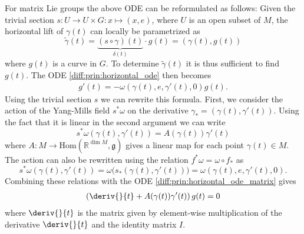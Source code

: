     \begin{example}
         For matrix Lie groups the above ODE can be reformulated as follows: Given the trivial section $s:U\rightarrow U\times G:x\mapsto (x, e)$, where $U$ is an open subset of $M$, the horizontal lift of $\gamma(t)$ can locally be parametrized as \[\widetilde{\gamma}(t) = \underbrace{(s\circ\gamma)(t)}_{\delta(t)}\cdot g(t) = (\gamma(t), g(t))\] where $g(t)$ is a curve in $G$. To determine $\widetilde{\gamma}(t)$ it is thus sufficient to find $g(t)$. The ODE \ref{diff:prin:horizontal_ode} then becomes
        \begin{gather}
            \label{diff:prin:horizontal_ode_matrix}
            g'(t) = -\omega(\gamma(t), e, \gamma'(t), 0)g(t).
        \end{gather}
        Using the trivial section $s$ we can rewrite this formula. First, we consider the action of the Yang-Mills field $s^*\omega$ on the derivative $\gamma_* = (\gamma(t), \gamma'(t))$. Using the fact that it is linear in the second argument we can write \[s^*\omega(\gamma(t), \gamma'(t)) = A(\gamma(t))\gamma'(t)\] where $A:M\rightarrow\text{Hom}(\mathbb{R}^{\dim M}, \mathfrak{g})$ gives a linear map for each point $\gamma(t)\in M$. The action can also be rewritten using the relation $f^*\omega = \omega\circ f_\ast$ as\[s^*\omega(\gamma(t), \gamma'(t)) = \omega\Big(s_\ast(\gamma(t), \gamma'(t))\Big) = \omega(\gamma(t), e, \gamma'(t), 0).\] Combining these relations with the ODE \ref{diff:prin:horizontal_ode_matrix} gives
        \begin{gather}
            \label{diff:prin:horizontal_ode_derivative}
            \left(\deriv{}{t} + A(\gamma(t))\gamma'(t)\right)g(t) = 0
        \end{gather}
        where $\deriv{}{t}$ is the matrix given by element-wise multiplication of the derivative $\deriv{}{t}$ and the identity matrix $I$.
    \end{example}

